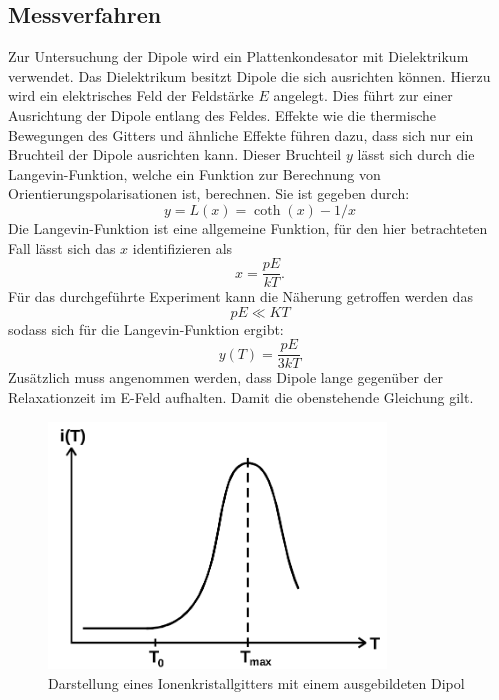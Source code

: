 \subsection{Messverfahren}
Zur Untersuchung der Dipole wird ein Plattenkondesator mit
Dielektrikum verwendet. Das Dielektrikum besitzt Dipole  die sich
ausrichten können. Hierzu wird ein elektrisches
Feld der Feldstärke $E$ angelegt. Dies führt zur einer Ausrichtung der
Dipole entlang des Feldes. Effekte wie die thermische Bewegungen des Gitters und
ähnliche Effekte führen dazu, dass sich nur ein Bruchteil der Dipole ausrichten kann.
Dieser Bruchteil $y$ lässt sich durch die Langevin-Funktion, welche ein
Funktion zur Berechnung von Orientierungspolarisationen ist, berechnen.
Sie ist gegeben durch:
$$y=L(x)=\coth(x)-1/x$$
Die Langevin-Funktion ist eine allgemeine Funktion, für den hier
betrachteten Fall lässt sich das $x$ identifizieren als
$$x=\frac{pE}{kT}.$$
Für das durchgeführte Experiment kann die Näherung getroffen werden das
$$pE \ll KT$$
sodass sich für die Langevin-Funktion ergibt:
$$y(T)=\frac{pE}{3kT}$$
Zusätzlich muss angenommen werden, dass Dipole lange gegenüber der
Relaxationzeit im E-Feld aufhalten. Damit die obenstehende Gleichung
gilt.

\begin{figure}
\centering
\includegraphics[width=0.8\textwidth]{ressources/stromfluss.png}
\caption{Darstellung eines Ionenkristallgitters mit einem ausgebildeten Dipol}
\label{theo1}
\end{figure}


